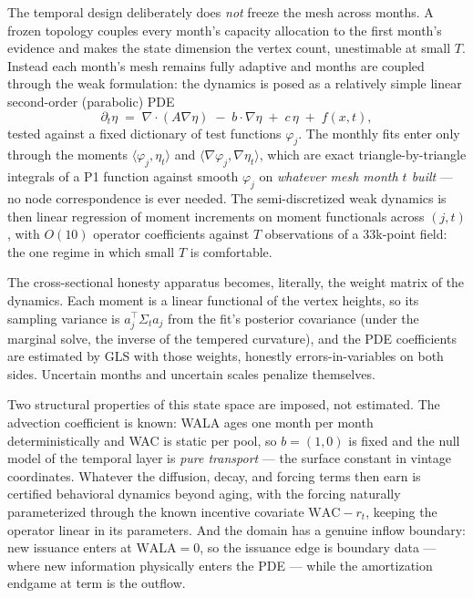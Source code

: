 \documentclass[11pt]{article}
\begin{document}
The temporal design deliberately does \emph{not} freeze the mesh across
months. A frozen topology couples every month's capacity allocation to the
first month's evidence and makes the state dimension the vertex count,
unestimable at small $T$. Instead each month's mesh remains fully adaptive
and months are coupled through the weak formulation: the dynamics is posed
as a relatively simple linear second-order (parabolic) PDE
\[
\partial_t \eta \;=\; \nabla\!\cdot\!(A\nabla\eta) \;-\; b\!\cdot\!\nabla\eta
\;+\; c\,\eta \;+\; f(x,t),
\]
tested against a fixed dictionary of test functions $\varphi_j$. The
monthly fits enter only through the moments
$\langle \varphi_j, \eta_t\rangle$ and
$\langle \nabla\varphi_j, \nabla\eta_t\rangle$, which are exact
triangle-by-triangle integrals of a P1 function against smooth
$\varphi_j$ on \emph{whatever mesh month $t$ built} --- no node
correspondence is ever needed. The semi-discretized weak dynamics is then
linear regression of moment increments on moment functionals across
$(j,t)$, with $O(10)$ operator coefficients against $T$ observations of a
33k-point field: the one regime in which small $T$ is comfortable.

The cross-sectional honesty apparatus becomes, literally, the weight
matrix of the dynamics. Each moment is a linear functional of the vertex
heights, so its sampling variance is $a_j^{\top}\Sigma_t a_j$ from the
fit's posterior covariance (under the marginal solve, the inverse of the
tempered curvature), and the PDE coefficients are estimated by GLS with
those weights, honestly errors-in-variables on both sides. Uncertain
months and uncertain scales penalize themselves.

Two structural properties of this state space are imposed, not estimated.
The advection coefficient is known: WALA ages one month per month
deterministically and WAC is static per pool, so $b=(1,0)$ is fixed and
the null model of the temporal layer is \emph{pure transport} --- the
surface constant in vintage coordinates. Whatever the diffusion, decay,
and forcing terms then earn is certified behavioral dynamics beyond
aging, with the forcing naturally parameterized through the known
incentive covariate $\mathrm{WAC}-r_t$, keeping the operator linear in
its parameters. And the domain has a genuine inflow boundary: new
issuance enters at $\mathrm{WALA}=0$, so the issuance edge is boundary
data --- where new information physically enters the PDE --- while the
amortization endgame at term is the outflow.
\end{document}

